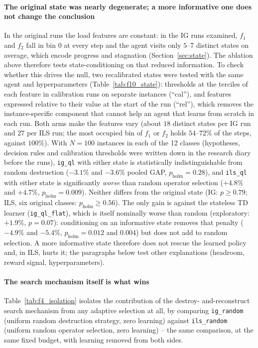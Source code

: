 \documentclass[final,3p,times,11pt,authoryear]{elsarticle}
\begin{document}
\paragraph{The original state was nearly degenerate; a more informative one
does not change the conclusion}
In the original runs the load features are constant: in the IG runs
examined, $f_1$ and $f_2$ fall in bin 0 at every step and the agent
visits only $5$--$7$ distinct states on average, which encode progress
and stagnation (Section~\ref{sec:state}). The ablation above therefore
tests state-conditioning on that reduced information. To check whether
this drives the null, two recalibrated states were tested with the same
agent and hyperparameters (Table~\ref{tab:f10_state}): thresholds at the
terciles of each feature in calibration runs on separate instances
(``cal''), and features expressed relative to their value at the start
of the run (``rel''), which removes the instance-specific component that
cannot help an agent that learns from scratch in each run. Both arms
make the features vary (about $18$ distinct states per IG run and $27$
per ILS run; the most occupied bin of $f_1$ or $f_2$ holds $54$--$72\%$
of the steps, against $100\%$). With $N=100$ instances in each of the 12
classes (hypotheses, decision rules and calibration thresholds were
written down in the research diary before the runs),
\texttt{ig\_ql} with either state is statistically indistinguishable
from random destruction ($-3.1\%$ and $-3.6\%$ pooled GAP,
$p_{\mathrm{holm}}=0.28$), and \texttt{ils\_ql} with either state is
significantly \emph{worse} than random operator selection ($+4.8\%$ and
$+4.7\%$, $p_{\mathrm{holm}}=0.009$). Neither differs from the original
state (IG: $p \geq 0.79$; ILS, six original classes:
$p_{\mathrm{holm}} \geq 0.56$). The only gain is against the stateless
TD learner (\texttt{ig\_ql\_flat}), which is itself nominally worse than
random (exploratory: $+1.9\%$, $p=0.07$): conditioning on an informative
state removes that penalty ($-4.9\%$ and $-5.4\%$,
$p_{\mathrm{holm}}=0.012$ and $0.004$) but does not add to random
selection. A more informative state therefore does not rescue the
learned policy and, in ILS, hurts it; the paragraphs below test other
explanations (headroom, reward signal, hyperparameters).



\paragraph{The search mechanism itself is what wins}
Table~\ref{tab:f4_isolation} isolates the contribution of the destroy-%
and-reconstruct search mechanism from any adaptive selection at all,
by comparing \texttt{ig\_random} (uniform random destruction strategy,
zero learning) against \texttt{ils\_random} (uniform random operator
selection, zero learning) -- the same comparison, at the same fixed
budget, with learning removed from both sides.
\end{document}
